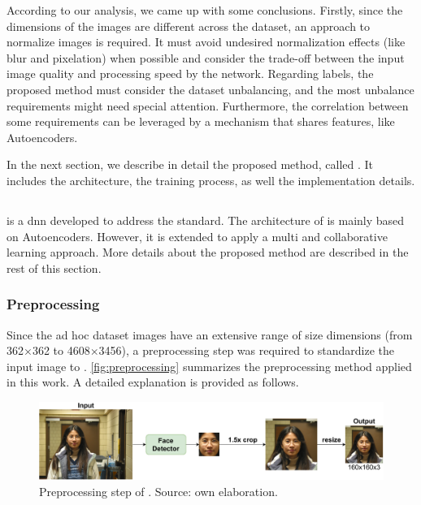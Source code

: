 According to our analysis, we came up with some conclusions. Firstly, since the dimensions of the images are different across the dataset, an approach to normalize images is required. It must avoid undesired normalization effects (like blur and pixelation) when possible and consider the trade-off between the input image quality and processing speed by the network. Regarding labels, the proposed method must consider the dataset unbalancing, and the most unbalance requirements might need special attention. Furthermore, the correlation between some requirements can be leveraged by a mechanism that shares features, like Autoencoders.

In the next section, we describe in detail the proposed method, called \methodname. It includes the architecture, the training process, as well the implementation details.

\subsection{\methodname}

\methodname is a \acl{dnn} developed to address the \icao standard. The architecture of \methodname is mainly based on Autoencoders. However, it is extended to apply a multi and collaborative learning approach. More details about the proposed method are described in the rest of this section. 

\subsubsection{Preprocessing} \label{sec:preprocessing}

Since the ad hoc dataset images have an extensive range of size dimensions (from 362$\times$362 to 4608$\times$3456), a preprocessing step was required to standardize the input image to \methodname. \autoref{fig:preprocessing} summarizes the preprocessing method applied in this work. A detailed explanation is provided as follows.

\begin{figure}
\centering
\includegraphics[width=\linewidth]{images/preprocessing.pdf}
\caption{Preprocessing step of \methodname. Source: own elaboration.}
\label{fig:preprocessing}
\end{figure}


